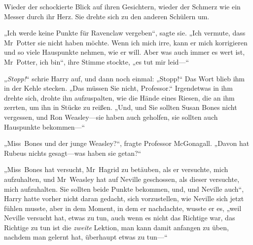 
Wieder der schockierte Blick auf ihren Gesichtern, wieder der Schmerz wie ein Messer durch ihr Herz. Sie drehte sich zu den anderen Schülern um.

„Ich werde keine Punkte für Ravenclaw vergeben“, sagte sie.
„Ich vermute, dass Mr~Potter sie nicht haben möchte. Wenn ich mich irre, kann er mich korrigieren und so viele Hauspunkte nehmen, wie er will. Aber was auch immer es wert ist, Mr~Potter, ich bin“, ihre Stimme stockte, „es tut mir leid—“

\later

„\emph{Stopp!}“ schrie Harry auf, und dann noch einmal:
„Stopp!“ Das Wort blieb ihm in der Kehle stecken.
„Das müssen Sie nicht, Professor.“ Irgendetwas in ihm drehte sich, drohte ihn aufzuspalten, wie die Hände eines Riesen, die an ihm zerrten, um ihn in Stücke zu reißen.
„Und, und Sie sollten Susan Bones nicht vergessen, und Ron Weasley—sie haben auch geholfen, sie sollten auch Hauspunkte bekommen—“

„Miss~Bones und der junge Weasley?“, fragte Professor McGonagall.
„Davon hat Rubeus nichts gesagt—was haben sie getan?“

„Miss~Bones hat versucht, Mr~Hagrid zu betäuben, als er versuchte, mich aufzuhalten, und Mr~Weasley hat auf Neville geschossen, als dieser versuchte, mich aufzuhalten. Sie sollten beide Punkte bekommen, und, und Neville auch“, Harry hatte vorher nicht daran gedacht, sich vorzustellen, wie Neville sich jetzt fühlen musste, aber in dem Moment, in dem er nachdachte, wusste er es, „weil Neville versucht hat, etwas zu tun, auch wenn es nicht das Richtige war, das Richtige zu tun ist die \emph{zweite} Lektion, man kann damit anfangen zu üben, nachdem man gelernt hat, überhaupt etwas zu tun—“

